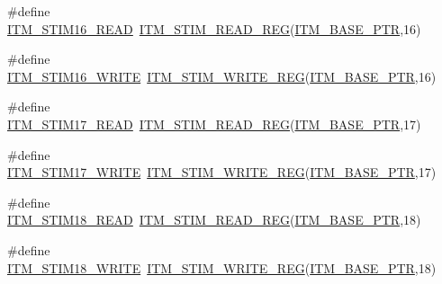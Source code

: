 \begin{DoxyCompactItemize}
\item 
\#define \hyperlink{group___i_t_m___register___accessor___macros_ga9036d1cfac0837b32666e7cb353cfd95}{I\+T\+M\+\_\+\+S\+T\+I\+M16\+\_\+\+R\+E\+AD}~\hyperlink{group___i_t_m___register___accessor___macros_ga5009882336aadcd4f37b45cf3395c450}{I\+T\+M\+\_\+\+S\+T\+I\+M\+\_\+\+R\+E\+A\+D\+\_\+\+R\+EG}(\hyperlink{group___i_t_m___peripheral_gafaddee8fe8b6a898d4e5edc43ee0d703}{I\+T\+M\+\_\+\+B\+A\+S\+E\+\_\+\+P\+TR},16)
\item 
\#define \hyperlink{group___i_t_m___register___accessor___macros_gace1ad469c70d11bf39a60780830605f3}{I\+T\+M\+\_\+\+S\+T\+I\+M16\+\_\+\+W\+R\+I\+TE}~\hyperlink{group___i_t_m___register___accessor___macros_ga049ca92a4e78e77c19af81e51aa73f1c}{I\+T\+M\+\_\+\+S\+T\+I\+M\+\_\+\+W\+R\+I\+T\+E\+\_\+\+R\+EG}(\hyperlink{group___i_t_m___peripheral_gafaddee8fe8b6a898d4e5edc43ee0d703}{I\+T\+M\+\_\+\+B\+A\+S\+E\+\_\+\+P\+TR},16)
\item 
\#define \hyperlink{group___i_t_m___register___accessor___macros_ga3f00966b4f023808c0d22b5c88d9ad84}{I\+T\+M\+\_\+\+S\+T\+I\+M17\+\_\+\+R\+E\+AD}~\hyperlink{group___i_t_m___register___accessor___macros_ga5009882336aadcd4f37b45cf3395c450}{I\+T\+M\+\_\+\+S\+T\+I\+M\+\_\+\+R\+E\+A\+D\+\_\+\+R\+EG}(\hyperlink{group___i_t_m___peripheral_gafaddee8fe8b6a898d4e5edc43ee0d703}{I\+T\+M\+\_\+\+B\+A\+S\+E\+\_\+\+P\+TR},17)
\item 
\#define \hyperlink{group___i_t_m___register___accessor___macros_gab955a13756ae2b569880dbef823a29a4}{I\+T\+M\+\_\+\+S\+T\+I\+M17\+\_\+\+W\+R\+I\+TE}~\hyperlink{group___i_t_m___register___accessor___macros_ga049ca92a4e78e77c19af81e51aa73f1c}{I\+T\+M\+\_\+\+S\+T\+I\+M\+\_\+\+W\+R\+I\+T\+E\+\_\+\+R\+EG}(\hyperlink{group___i_t_m___peripheral_gafaddee8fe8b6a898d4e5edc43ee0d703}{I\+T\+M\+\_\+\+B\+A\+S\+E\+\_\+\+P\+TR},17)
\item 
\#define \hyperlink{group___i_t_m___register___accessor___macros_ga4d40ae88921303412c9628a350572a8a}{I\+T\+M\+\_\+\+S\+T\+I\+M18\+\_\+\+R\+E\+AD}~\hyperlink{group___i_t_m___register___accessor___macros_ga5009882336aadcd4f37b45cf3395c450}{I\+T\+M\+\_\+\+S\+T\+I\+M\+\_\+\+R\+E\+A\+D\+\_\+\+R\+EG}(\hyperlink{group___i_t_m___peripheral_gafaddee8fe8b6a898d4e5edc43ee0d703}{I\+T\+M\+\_\+\+B\+A\+S\+E\+\_\+\+P\+TR},18)
\item 
\#define \hyperlink{group___i_t_m___register___accessor___macros_ga1fb39bc1a36c6aed07b8588d2d1c77b0}{I\+T\+M\+\_\+\+S\+T\+I\+M18\+\_\+\+W\+R\+I\+TE}~\hyperlink{group___i_t_m___register___accessor___macros_ga049ca92a4e78e77c19af81e51aa73f1c}{I\+T\+M\+\_\+\+S\+T\+I\+M\+\_\+\+W\+R\+I\+T\+E\+\_\+\+R\+EG}(\hyperlink{group___i_t_m___peripheral_gafaddee8fe8b6a898d4e5edc43ee0d703}{I\+T\+M\+\_\+\+B\+A\+S\+E\+\_\+\+P\+TR},18)

\end{DoxyCompactItemize}

